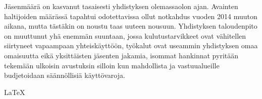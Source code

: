 \documentclass[a4paper]{memoir}
\begin{document}
Jäsenmäärä on kasvanut tasaisesti yhdistyksen olemassaolon ajan. Avainten haltijoiden määrässä tapahtui odotettavissa ollut notkahdus vuoden 2014 muuton aikana, mutta tästäkin on noustu taas uuteen nousuun. Yhdistyksen taloudenpito on muuttunut yhä enemmän suuntaan, jossa kulutustarvikkeet ovat vähitellen siirtyneet vapaampaan yhteiskäyttöön, työkalut ovat useammin yhdistyksen omaa omaisuutta eikä yksittäisten jäsenten jakamia, isommat hankinnat pyritään tekemään ulkoisin avustuksin silloin kun mahdollista ja vastuualueille budjetoidaan säännöllisiä käyttövaroja.

\vfill

\LaTeX
 
\end{document}

